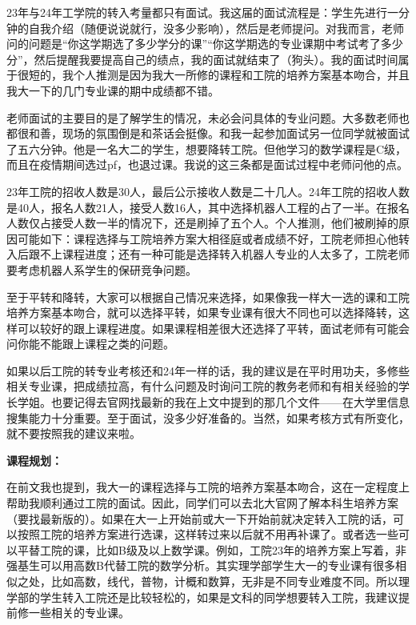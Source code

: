 \documentclass[11pt,oneside]{book}
\begin{document}
\vspace{10pt}

23年与24年工学院的转入考量都只有面试。我这届的面试流程是：学生先进行一分钟的自我介绍（随便说说就行，没多少影响），然后是老师提问。对我而言，老师问的问题是“你这学期选了多少学分的课”“你这学期选的专业课期中考试考了多少分”，然后提醒我要提高自己的绩点，我的面试就结束了（狗头）。我的面试时间属于很短的，我个人推测是因为我大一所修的课程和工院的培养方案基本吻合，并且我大一下的几门专业课的期中成绩都不错。

\vspace{10pt}

老师面试的主要目的是了解学生的情况，未必会问具体的专业问题。大多数老师也都很和善，现场的氛围倒是和茶话会挺像。和我一起参加面试另一位同学就被面试了五六分钟。他是一名大二的学生，想要降转工院。但他学习的数学课程是C级，而且在疫情期间选过pf，也退过课。我说的这三条都是面试过程中老师问他的点。

\vspace{10pt}

23年工院的招收人数是30人，最后公示接收人数是二十几人。24年工院的招收人数是40人，报名人数21人，接受人数16人，其中选择机器人工程的占了一半。在报名人数仅占接受人数一半的情况下，还是刷掉了五个人。个人推测，他们被刷掉的原因可能如下：课程选择与工院培养方案大相径庭或者成绩不好，工院老师担心他转入后跟不上课程进度；还有一种可能是选择转入机器人专业的人太多了，工院老师要考虑机器人系学生的保研竞争问题。

\vspace{10pt}

至于平转和降转，大家可以根据自己情况来选择，如果像我一样大一选的课和工院培养方案基本吻合，就可以选择平转，如果专业课有很大不同也可以选择降转，这样可以较好的跟上课程进度。如果课程相差很大还选择了平转，面试老师有可能会问你能不能跟上课程之类的问题。

\vspace{10pt}

如果以后工院的转专业考核还和24年一样的话，我的建议是在平时用功夫，多修些相关专业课，把成绩拉高，有什么问题及时询问工院的教务老师和有相关经验的学长学姐。也要记得去官网找最新的我在上文中提到的那几个文件——在大学里信息搜集能力十分重要。至于面试，没多少好准备的。当然，如果考核方式有所变化，就不要按照我的建议来啦。

\textbf{课程规划：}

在前文我也提到，我大一的课程选择与工院的培养方案基本吻合，这在一定程度上帮助我顺利通过工院的面试。因此，同学们可以去北大官网了解本科生培养方案（要找最新版的）。如果在大一上开始前或大一下开始前就决定转入工院的话，可以按照工院的培养方案进行选课，这样转过来以后就不用再补课了。或者选一些可以平替工院的课，比如B级及以上数学课。例如，工院23年的培养方案上写着，非强基生可以用高数B代替工院的数学分析。其实理学部学生大一的专业课有很多相似之处，比如高数，线代，普物，计概和数算，无非是不同专业难度不同。所以理学部的学生转入工院还是比较轻松的，如果是文科的同学想要转入工院，我建议提前修一些相关的专业课。
\end{document}
